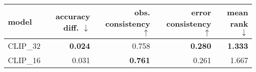 \begin{tabular}{lrrrr}
\toprule
   model & accuracy diff. $\downarrow$ & obs. consistency $\uparrow$ & error consistency $\uparrow$ & mean rank $\downarrow$ \\
\midrule
CLIP\_32 &              \textbf{0.024} &                       0.758 &               \textbf{0.280} &         \textbf{1.333} \\
CLIP\_16 &                       0.031 &              \textbf{0.761} &                        0.261 &                  1.667 \\
\bottomrule
\end{tabular}

